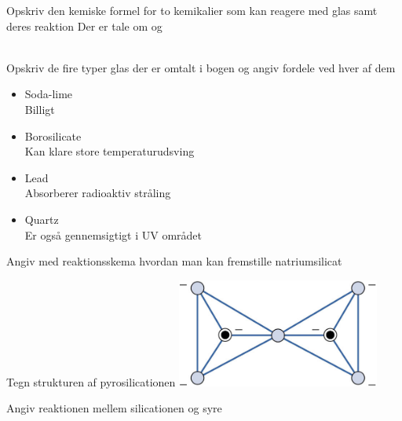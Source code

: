 \begin{flashcard}[Reaktion]{Opskriv den kemiske formel for to kemikalier som kan reagere med glas samt deres reaktion}
Der er tale om  og \\ \vspace{7pt}
\\ \vspace{7pt}
\end{flashcard}

\begin{flashcard}[Egenskab]{Opskriv de fire typer glas der er omtalt i bogen og angiv fordele ved hver af dem}
\begin{itemize}
\item Soda-lime\\Billigt
\item Borosilicate\\Kan klare store temperaturudsving
\item Lead\\Absorberer radioaktiv stråling
\item Quartz\\Er også gennemsigtigt i UV området
\end{itemize}
\end{flashcard}

\begin{flashcard}[Fremstilling]{Angiv med reaktionsskema hvordan man kan fremstille natriumsilicat}
\end{flashcard}

\begin{flashcard}[Struktur]{Tegn strukturen af pyrosilicationen}
\includegraphics[width=0.5\textwidth]{figures/k14s344Pyrosilicate.png}
\end{flashcard}

\begin{flashcard}[Reaktion]{Angiv reaktionen mellem silicationen og syre}
\end{flashcard}

